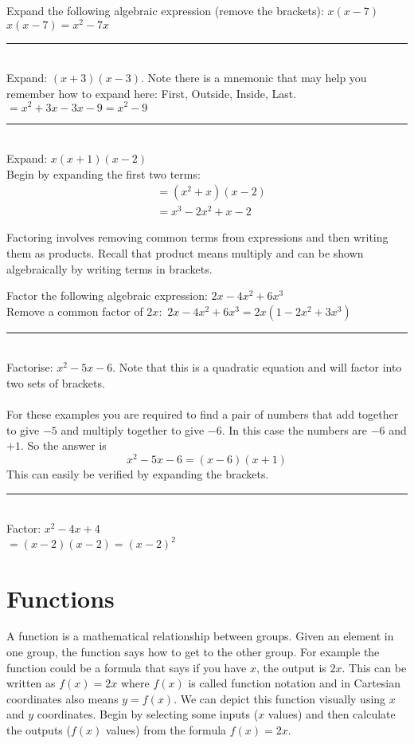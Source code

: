 \example Expand the following algebraic expression (remove the brackets): $x(x-7)$\medskip\\
\solution $x(x-7)=x^2-7x$\\
\rule{6.8cm}{0.5pt}\\
\example Expand: $(x+3)(x-3)$. Note there is a mnemonic \textbf{} that may help you remember how to expand here: First, Outside, Inside, Last.\medskip\\
\solution $=x^2+3x-3x-9=x^2-9$\\
\rule{6.8cm}{0.5pt}\\
\example Expand: $x(x+1)(x-2)$\medskip\\
\solution Begin by expanding the first two terms:
\begin{align*} &=(x^2+x)(x-2)\\
&=x^3-2x^2+x-2
\end{align*}

Factoring involves removing common terms from expressions and then writing them as products. Recall that product means multiply and can be shown algebraically by writing terms in brackets.

\example Factor the following algebraic expression: $2x-4x^2+6x^3$\medskip\\
\solution Remove a common factor of $2x$: $\,2x-4x^2+6x^3=2x(1-2x^2+3x^3)$\\
\rule{6.8cm}{0.5pt}\\
\example Factorise: $x^{2} -5 x -6$. Note that this is a quadratic equation and will factor into two sets of brackets.\\
\solution \\
For these examples you are required to find a pair of numbers that add together to give $ -5$ and multiply together to give $ -6$. In this case the numbers are $ -6$ and $ +1$. So the answer is
\begin{equation*}x^{2} -5 x -6 =\left (x -6\right ) \left (x +1\right )
\end{equation*}
This can easily be verified by expanding the brackets.\\
\rule{6.8cm}{0.5pt}\\
\example Factor: $x^2-4x+4$\medskip\\
\solution $=(x-2)(x-2)=(x-2)^2$

\section{Functions}\label{sec:functions}
A function is a mathematical relationship between groups. Given an element in one group, the function says how to get to the other group. For example the function could be a formula that says if you have $x$, the output is $2x$. This can be written as $f(x)=2x$ where $f(x)$ is called function notation and in Cartesian coordinates also means $y=f(x)$. We can depict this function visually using $x$ and $y$ coordinates. Begin by selecting some inputs ($x$ values) and then calculate the outputs ($f(x)$ values) from the formula $f(x)=2x$.

